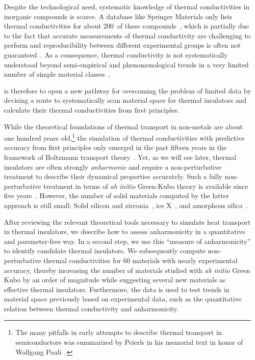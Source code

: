 Despite the technological need, systematic knowledge of thermal conductivities in inorganic compounds is scarce. A database like Springer Materials only lists thermal conductivities for about 200~of these compounds~\cite{SpringerMaterials}, which is partially due to the fact that accurate measurements of thermal conductivity are challenging to perform and reproducibility between different experimental groups is often not guaranteed~\cite{wei2016}. As a consequence, thermal conductivity is not systematically understood beyond semi-empirical and phenomenological trends in a very limited number of simple material classes~\cite{morelli2006}.

 is therefore to open a new pathway for overcoming the problem of limited data by devising a route to systematically scan material space for thermal insulators and calculate their thermal conductivities from first principles. 

While the theoretical foundations of thermal transport in non-metals are about one hundred years old,\footnote{The many pitfalls in early attempts to describe thermal transport in semiconductors was summarized by Peierls in his memorial text in honor of Wolfgang Pauli~\cite{Peierls1960}.} the simulation of thermal conductivities with predictive accuracy from first principles only emerged in the past fifteen years in the framework of Boltzmann transport theory~\cite{Broido2007}. Yet, as we will see later, thermal insulators are often strongly \emph{anharmonic} and require a non-perturbative treatment to describe their dynamical properties accurately. Such a fully non-perturbative treatment in terms of \emph{ab initio} Green-Kubo theory is available since five years~\cite{Marcolongo2016,Carbogno2016}. However, the number of solid materials computed by the latter approach is still small: Solid silicon and zirconia~\cite{Carbogno2016}, ice X~\cite{Grasselli2020}, and amorphous silica~\cite{Marcolongo2020}. 

 After reviewing the relevant theoretical tools necessary to simulate heat transport in thermal insulators, we describe how to assess anharmonicity in a quantitative and paremeter-free way. In a second step, we use this ``measure of anharmonicity'' to identify candidate thermal insulators. We subsequently compute non-perturbative thermal conductivities for 60 materials with nearly experimental accuracy, thereby increasing the number of materials studied with \emph{ab initio} Green Kubo by an order of magnitude while suggesting several new materials as effective thermal insulators. Furthermore, the data is used to test trends in material space previously based on experimental data, such as the quantitative relation between thermal conductivity and anharmonicity.


